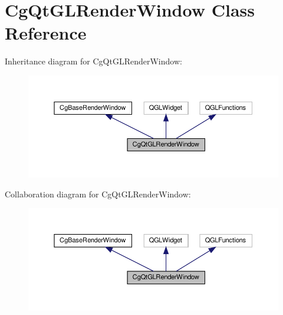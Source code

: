 \hypertarget{class_cg_qt_g_l_render_window}{}\section{Cg\+Qt\+G\+L\+Render\+Window Class Reference}
\label{class_cg_qt_g_l_render_window}


Inheritance diagram for Cg\+Qt\+G\+L\+Render\+Window\+:
\nopagebreak
\begin{figure}[H]
\begin{center}
\leavevmode
\includegraphics[width=350pt]{class_cg_qt_g_l_render_window__inherit__graph}
\end{center}
\end{figure}


Collaboration diagram for Cg\+Qt\+G\+L\+Render\+Window\+:
\nopagebreak
\begin{figure}[H]
\begin{center}
\leavevmode
\includegraphics[width=350pt]{class_cg_qt_g_l_render_window__coll__graph}
\end{center}
\end{figure}
